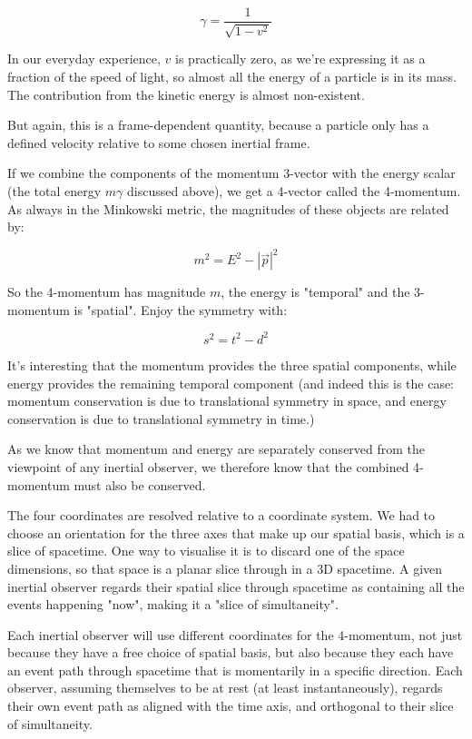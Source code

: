 $$\gamma = \frac{1}{\sqrt{1-v^2}} $$

In our everyday experience, $v$ is practically zero, as we're expressing it as a fraction of the speed of light, so almost all the energy of a particle is in its mass. The contribution from the kinetic energy is almost non-existent.

But again, this is a frame-dependent quantity, because a particle only has a defined velocity relative to some chosen inertial frame.

If we combine the components of the momentum 3-vector with the energy scalar (the total energy $m\gamma$ discussed above), we get a 4-vector called the 4-momentum. As always in the Minkowski metric, the magnitudes of these objects are related by:

$$m^2 = E^2 - |\vec{p}|^2$$

So the 4-momentum has magnitude $m$, the energy is "temporal" and the 3-momentum is "spatial". Enjoy the symmetry with:

$$s^2 = t^2 - d^2$$

It's interesting that the momentum provides the three spatial components, while energy provides the remaining temporal component (and indeed this is the case: momentum conservation is due to translational symmetry in space, and energy conservation is due to translational symmetry in time.)

As we know that momentum and energy are separately conserved from the viewpoint of any inertial observer, we therefore know that the combined 4-momentum must also be conserved.

The four coordinates are resolved relative to a coordinate system. We had to choose an orientation for the three axes that make up our spatial basis, which is a slice of spacetime. One way to visualise it is to discard one of the space dimensions, so that space is a planar slice through in a 3D spacetime. A given inertial observer regards their spatial slice through spacetime as containing all the events happening "now", making it a "slice of simultaneity".

Each inertial observer will use different coordinates for the 4-momentum, not just because they have a free choice of spatial basis, but also because they each have an event path through spacetime that is momentarily in a specific direction. Each observer, assuming themselves to be at rest (at least instantaneously), regards their own event path as aligned with the time axis, and orthogonal to their slice of simultaneity.

